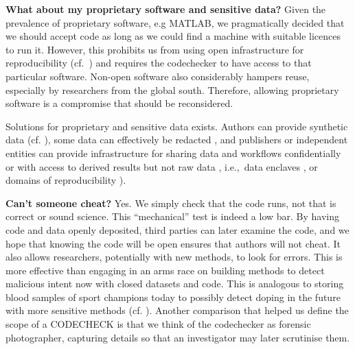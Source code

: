 \documentclass[12pt]{article}
\begin{document}
\textbf{What about my proprietary software and sensitive data?}  Given
the prevalence of proprietary software, e.g MATLAB, we pragmatically
decided that we should accept code as long as we could find a machine
with suitable licences to run it.  However, this prohibits us from
using open infrastructure for reproducibility
(cf.~\cite{konkol_publishing_2020,perkel_make_2019}) and requires the
codechecker to have access to that particular software.  Non-open
software also considerably hampers reuse, especially by researchers
from the global south. Therefore, allowing proprietary software is a
compromise that should be reconsidered.

Solutions for proprietary and sensitive data exists.  Authors can
provide synthetic data (cf. \cite{shannon_opening_2018}), some data
can effectively be redacted \cite{oloughlin_data_2015}, and publishers
or independent entities can provide infrastructure for sharing data
and workflows confidentially \cite{perignon_certify_2019} or with
access to derived results but not raw data
\cite{shannon_opening_2018}, i.e.,~data enclaves
\cite{foster_research_2018}, or domains of reproducibility
\cite{harris_more_2017}).

\textbf{Can't someone cheat?} Yes. We simply check that the code runs,
not that is correct or sound science. This ``mechanical'' test is
indeed a low bar.  By having code and data openly deposited, third
parties can later examine the code, and we hope that knowing the code
will be open ensures that authors will not cheat.  It also allows
researchers, potentially with new methods, to look for errors.  This
is more effective than engaging in an arms race on building methods to
detect malicious intent now with closed datasets and code.  This is
analogous to storing blood samples of sport champions today to
possibly detect doping in the future with more sensitive methods
(cf. \cite{everythinghertz97}).  Another comparison that helped us
define the scope of a CODECHECK is that we think of the codechecker as
forensic photographer, capturing details so that an investigator may
later scrutinise them.
\end{document}
